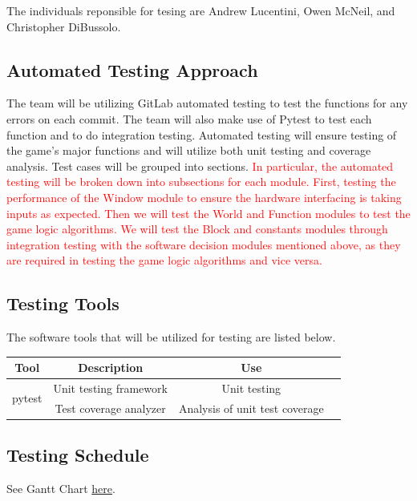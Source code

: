 \documentclass[12pt, titlepage]{article}
\begin{document}
The individuals reponsible for tesing are Andrew Lucentini, Owen McNeil, and Christopher DiBussolo.

\subsection{Automated Testing Approach}
The team will be utilizing GitLab automated testing to test the functions for any errors on each commit.
The team will also make use of Pytest to test each function and to do integration testing.
Automated testing will ensure testing of the game's major functions and will utilize both unit testing and coverage analysis. Test cases will be grouped into sections.
\textcolor{red}{In particular, the automated testing will be broken down into subsections for each module. First, testing the performance of the Window module to ensure the hardware interfacing is taking inputs as expected. Then we will test the World and Function modules to test the game logic algorithms. We will test the Block and constants modules through integration testing with the software decision modules mentioned above, as they are required in testing the game logic algorithms and vice versa.}


\subsection{Testing Tools}

The software tools that will be utilized for testing are listed below.\\

\begin{center}
\begin{tabular}{ |c||c|c|c| } 
\hline
\textbf{Tool} & \textbf{Description} & \textbf{Use} \\
\hline
\multirow{3}{4em}{pytest} & Unit testing framework & Unit testing \\ 
& Test coverage analyzer & Analysis of unit test coverage \\
\hline
\end{tabular}
\end{center}


\subsection{Testing Schedule}
		
See Gantt Chart \href{https://gitlab.cas.mcmaster.ca/lucenta/3XA3/blob/master/ProjectSchedule/Project\%20Schedule.pdf}{here}.
\end{document}
